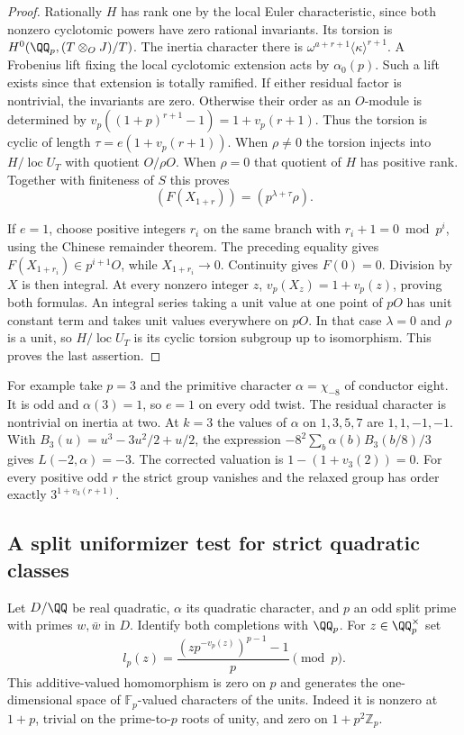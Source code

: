 \documentclass[a4paper,11pt]{article}
\theoremstyle{definition}
\theoremstyle{remark}
\newcommand{\ZZ}{\mathbb Z}\newcommand{\ord}{\operatorname{ord}}
\numberwithin{equation}{section}
\begin{document}
\begin{proof}
Rationally \(H\) has rank one by the local Euler characteristic,
since both nonzero cyclotomic powers have zero rational invariants.
Its torsion is \(H^0(\QQ_p,(T\otimes_O J)/T)\).
The inertia character there is \(\omega^{a+r+1}
\langle\kappa\rangle^{r+1}\). A Frobenius lift fixing the local
cyclotomic extension acts by \(\alpha_0(p)\). Such a lift exists
since that extension is totally ramified. If either residual
factor is nontrivial, the invariants are zero. Otherwise their
order as an \(O\)-module is determined by
\(v_p((1+p)^{r+1}-1)=1+v_p(r+1)\). Thus the torsion is cyclic
of length \(\tau=e(1+v_p(r+1))\). When \(\rho\ne0\) the torsion
injects into \(H/\operatorname{loc} U_T\) with quotient
\(O/\rho O\). When \(\rho=0\) that quotient of \(H\) has positive
rank. Together with finiteness of \(S\) this proves
\[
          (F(X_{1+r}))=(p^{\lambda+\tau}\rho).
\]

If \(e=1\), choose positive integers \(r_i\) on the same branch
with \(r_i+1=0\bmod p^i\), using the Chinese remainder theorem.
The preceding equality gives \(F(X_{1+r_i})\in p^{i+1}O\),
while \(X_{1+r_i}\to0\). Continuity gives \(F(0)=0\).
Division by \(X\) is then integral. At every nonzero integer
\(z\), \(v_p(X_z)=1+v_p(z)\), proving both formulas. An integral
series taking a unit value at one point of \(pO\) has unit constant
term and takes unit values everywhere on \(pO\). In that case
\(\lambda=0\) and \(\rho\) is a unit, so \(H/\operatorname{loc} U_T\)
is its cyclic torsion subgroup up to isomorphism. This proves
the last assertion.
\end{proof}

For example take \(p=3\) and the primitive character
\(\alpha=\chi_{-8}\) of conductor eight. It is odd and
\(\alpha(3)=1\), so \(e=1\) on every odd twist. The residual
character is nontrivial on inertia at two. At \(k=3\) the values
of \(\alpha\) on \(1,3,5,7\) are \(1,1,-1,-1\).
With \(B_3(u)=u^3-3u^2/2+u/2\), the expression
\(-8^2\sum_b\alpha(b)B_3(b/8)/3\) gives \(L(-2,\alpha)=-3\).
The corrected valuation is \(1-(1+v_3(2))=0\).
For every positive odd \(r\) the strict group vanishes and the
relaxed group has order exactly \(3^{1+v_3(r+1)}\).

\subsection{A split uniformizer test for strict quadratic classes}\label{nav:IV-61}
Let \(D/\QQ\) be real quadratic, \(\alpha\) its quadratic
character, and \(p\) an odd split prime with primes \(w,\bar w\)
in \(D\). Identify both completions with \(\QQ_p\). For
\(z\in\QQ_p^\times\) set
\[
        l_p(z)=\frac{(zp^{-v_p(z)})^{p-1}-1}{p}\pmod p.
\]
This additive-valued homomorphism is zero on \(p\) and generates
the one-dimensional space of \(\mathbb F_p\)-valued characters
of the units. Indeed it is nonzero at \(1+p\), trivial on the
prime-to-\(p\) roots of unity, and zero on \(1+p^2\ZZ_p\).
\end{document}
